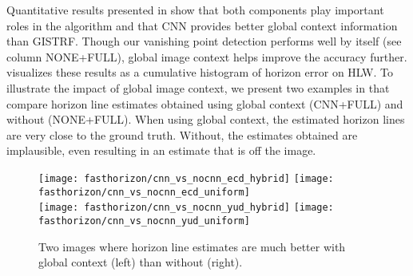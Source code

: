 Quantitative results presented in  show that both
components play important roles in the algorithm and that CNN provides
better global context information than GISTRF.  Though our vanishing
point detection performs well by itself (see column NONE+FULL), global
image context helps improve the accuracy further. 
visualizes these results as a cumulative histogram of horizon error
on HLW.  To illustrate the impact of global image context, we present
two examples in  that compare horizon line
estimates obtained using global context (CNN+FULL) and without
(NONE+FULL).  When using global context, the estimated horizon lines
are very close to the ground truth.  Without, the estimates obtained
are implausible, even resulting in an estimate that is off the image.

\begin{figure}
  \centering
  \texttt{[image: fasthorizon/cnn\_vs\_nocnn\_ecd\_hybrid]}
  \texttt{[image: fasthorizon/cnn\_vs\_nocnn\_ecd\_uniform]}
  \\
  \texttt{[image: fasthorizon/cnn\_vs\_nocnn\_yud\_hybrid]}
  \texttt{[image: fasthorizon/cnn\_vs\_nocnn\_yud\_uniform]}
  \caption{Two images where horizon line estimates are much better with global context (left) than without (right).}
  \label{fig:iscontext}
\end{figure}

